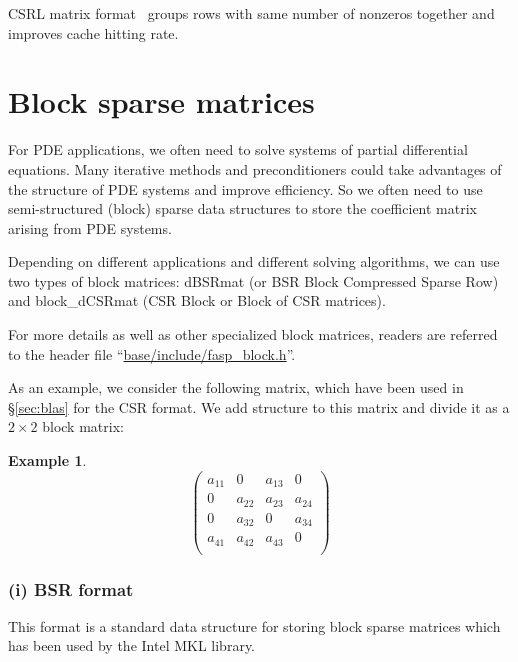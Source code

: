 \documentclass[11pt]{memoir}
\newtheorem{example}[theorem]{Example}
\begin{document}
CSRL matrix format~\cite{Mellor-crummey2004} groups rows with same number of nonzeros together and improves cache hitting rate.
%

%

\section{Block sparse matrices}\label{sec:bsr}

For PDE applications, we often need to solve systems of partial differential equations. Many iterative methods and preconditioners could take advantages of the structure of PDE systems and improve efficiency. So we often need to use semi-structured (block) sparse data structures to store the coefficient matrix arising from PDE systems. 

Depending on different applications and different solving algorithms, we can use two types of block matrices: dBSRmat (or BSR Block Compressed Sparse Row) and block\_dCSRmat (CSR Block or Block of CSR matrices). 

\begin{snugshade}\noindent
For more details as well as other specialized block matrices, readers are referred to the header file ``\url{base/include/fasp\_block.h}''.
\end{snugshade}

As an example, we consider the following matrix, which have been used in \S\ref{sec:blas} for the CSR format. We add structure to this matrix and divide it as a $2 \times 2$ block matrix:
%
\begin{example}\label{ex:block}
$$
\left(
\begin{array}{cc|cc}
a_{11} & 0 & a_{13} & 0 \\
0 & a_{22} & a_{23} & a_{24} \\
\hline
0 & a_{32} & 0 & a_{34} \\
a_{41}& a_{42} & a_{43} & 0 \\
\end{array}
\right)
$$
\end{example}

\subsubsection*{(i) BSR format}
This format is a standard data structure for storing block sparse matrices which has been used by the Intel MKL library. 
%

%
\end{document}
